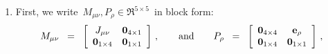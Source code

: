\begin{enumerate}
\begin{equation*}
		\mathbf{0}_{5 \times 5}\,,
	\end{equation*}
	as required.
\item
	First, we write \,$M_{\mu\nu}, P_{\rho} \in \Re^{5 \times 5}$\, in block form:
	\begin{equation*}
	M_{\mu\nu}
	\;\; = \;\;
		\left[\begin{array}{cc}
			J_{\mu\nu} & \mathbf{0}_{4 \times 1}
			\\
			\mathbf{0}_{1 \times 4} & \mathbf{0}_{1 \times 1}
			\end{array}\right]\,,
	\quad\quad
	\textnormal{and}
	\quad\quad
	P_{\rho}
	\;\; = \;\;
		\left[\begin{array}{cc}
			\mathbf{0}_{4 \times 4} & \mathbf{e}_{\rho}
			\\
			\mathbf{0}_{1 \times 4} & \mathbf{0}_{1 \times 1}
			\end{array}\right]\,,
	\end{equation*}


\end{enumerate}
